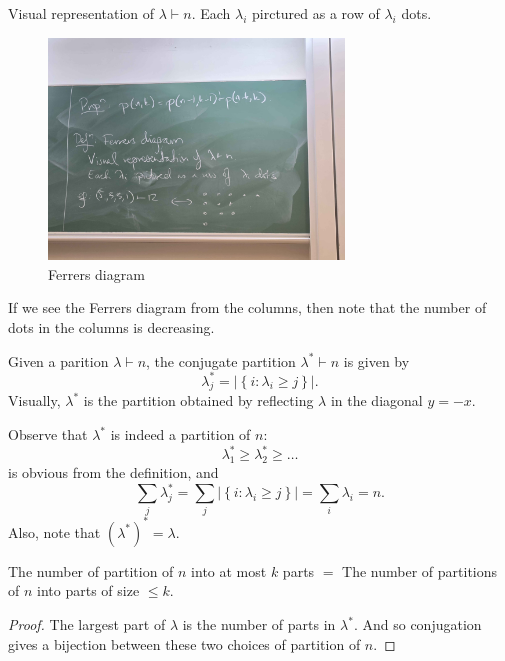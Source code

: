 \begin{definition}
    Visual representation of \(\lambda \vdash n\). Each \(\lambda _i\) pirctured as a row of \(\lambda _i\) dots.    
\end{definition}
\begin{figure}[H]
    \centering
    \includegraphics[width=0.7\textwidth]{./Figures/20250923_153141.jpg}
    \caption{Ferrers diagram}
    \label{fig:Ferrers}
\end{figure}

\begin{note}
    If we see the Ferrers diagram from the columns, then note that the number of dots in the columns is decreasing.
\end{note}

\begin{definition}
    Given a parition \(\lambda \vdash n\), the conjugate partition \(\lambda ^* \vdash n\) is given by 
    \[
        \lambda _j^* = \left\vert \left\{ i: \lambda _i \ge j \right\}  \right\vert. 
    \] 
    Visually, \(\lambda ^*\) is the partition obtained by reflecting \(\lambda  \) in the diagonal \(y = -x\).     
\end{definition}

Observe that \(\lambda ^*\) is indeed a partition of \(n\):
\[
    \lambda _1^* \ge \lambda _2^* \ge \dots 
\] is obvious from the definition, and 
\[
    \sum_{j} \lambda_j ^* = \sum_{j} \left\vert \left\{ i: \lambda _i \ge j \right\} \right\vert = \sum_{i} \lambda _i = n   .   
\]
Also, note that \(\left( \lambda ^* \right)^* = \lambda \). 

\begin{proposition}
    The number of partition of \(n\) into at most \(k\) parts \(=\) The number of partitions of \(n\) into parts of size \(\le k\).     
\end{proposition}
\begin{proof}
    The largest part of \(\lambda \) is the number of parts in \(\lambda ^*\). And so conjugation gives a bijection between these two choices of partition of \(n\).   
\end{proof}

